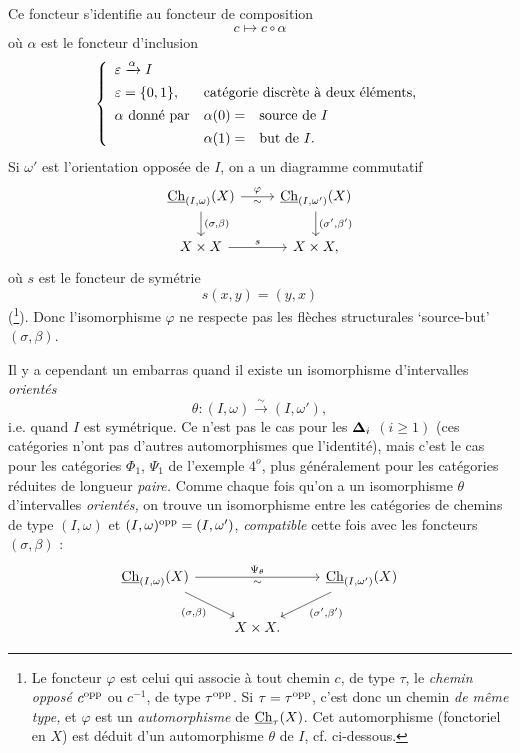 Ce foncteur s'identifie au foncteur de composition
\[
c \longmapsto c \circ \alpha
\]
où $\alpha$ est le foncteur d'inclusion
\[
\left\{
\begin{array}{lll}
\varepsilon \xrightarrow{\alpha} I & & \\[1ex]
\varepsilon = \{0,1\}, & \multicolumn{2}{l}{\text{catégorie discrète à deux éléments,}} \\[1ex]
\alpha \text{ donné par} & \alpha(0) = & \text{source de } I \\[1ex]
 & \alpha(1) = & \text{but de } I.
\end{array}
\right.
\]
Si $\omega'$ est l'orientation opposée de $I$, on a un diagramme commutatif
\[
\begin{tikzcd}
\Ch_{(I,\omega)}(X) \arrow[r, "\varphi", "\sim"'] \arrow[d, "{(\sigma,\beta)}"] & \Ch_{(I,\omega')}(X) \arrow[d, "{(\sigma',\beta')}"] \\
X \times X \arrow[r, "s"] & X \times X,
\end{tikzcd}
\]
où $s$ est le foncteur de symétrie
\[
s(x,y) = (y,x)
\]
(\footnote[6]{Le foncteur $\varphi$ est celui qui associe à tout chemin $c$, de type $\tau$, le \textit{chemin opposé $c^{\mathrm{opp}}$} ou $c^{-1}$, de type $\tau^{\mathrm{opp}}$. Si $\tau = \tau^{\mathrm{opp}}$, c'est donc un chemin \textit{de même type,} et $\varphi$ est un \textit{automorphisme} de $\underline{\mathrm{Ch}}_\tau(X)$. Cet automorphisme (fonctoriel en $X$) est déduit d'un automorphisme $\theta$ de $I$, cf. ci-dessous.}). Donc l'isomorphisme $\varphi$ ne respecte pas les flèches structurales `source-but' $(\sigma,\beta)$.

Il y a cependant un embarras quand il existe un isomorphisme d'intervalles \textit{orientés}
\[
\theta : (I,\omega) \xrightarrow{\sim} (I,\omega'),
\]
i.e. quand $I$ est symétrique. Ce n'est pas le cas pour les $\boldsymbol{\Delta}_i$ $(i \geq 1)$ (ces catégories n'ont pas d'autres automorphismes que l'identité), mais c'est le cas pour les catégories $\Phi_1$, $\Psi_1$ de l'exemple $4^o$, plus généralement  pour les catégories réduites de longueur \textit{paire.} Comme chaque fois qu'on a un isomorphisme $\theta$ d'intervalles \textit{orientés,} on trouve un isomorphisme entre les catégories de chemins de type $(I,\omega)$ et $(I,\omega)^{\mathrm{opp}} = (I,\omega')$, \textit{compatible} cette fois avec les foncteurs $(\sigma,\beta)$ :
\[
\begin{tikzcd}
\Ch_{(I,\omega)}(X) \arrow[rr, "\Psi_\theta", "\sim"'] \arrow[dr, "{(\sigma,\beta)}"'] & & \Ch_{(I,\omega')}(X) \arrow[dl, "{(\sigma',\beta')}"] \\
 & X \times X. &
\end{tikzcd}
\]

